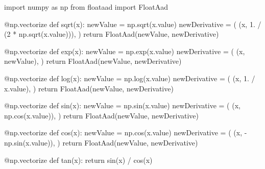 \documentclass[
  a4paper,
  DIV=11]{scrreprt}
\newenvironment{Shaded}{\begin{snugshade}}{\end{snugshade}}
\newcommand{\AttributeTok}[1]{\textcolor[rgb]{0.40,0.45,0.13}{#1}}
\newcommand{\ControlFlowTok}[1]{\textcolor[rgb]{0.00,0.23,0.31}{#1}}
\newcommand{\DecValTok}[1]{\textcolor[rgb]{0.68,0.00,0.00}{#1}}
\newcommand{\FloatTok}[1]{\textcolor[rgb]{0.68,0.00,0.00}{#1}}
\newcommand{\ImportTok}[1]{\textcolor[rgb]{0.00,0.46,0.62}{#1}}
\newcommand{\KeywordTok}[1]{\textcolor[rgb]{0.00,0.23,0.31}{#1}}
\newcommand{\NormalTok}[1]{\textcolor[rgb]{0.00,0.23,0.31}{#1}}
\newcommand{\OperatorTok}[1]{\textcolor[rgb]{0.37,0.37,0.37}{#1}}
\theoremstyle{definition}
\theoremstyle{definition}
\theoremstyle{remark}
\begin{document}
\begin{Shaded}
\begin{Highlighting}[]
\ImportTok{import}\NormalTok{ numpy }\ImportTok{as}\NormalTok{ np}
\ImportTok{from}\NormalTok{ floataad }\ImportTok{import}\NormalTok{ FloatAad}

\AttributeTok{@np.vectorize}
\KeywordTok{def}\NormalTok{ sqrt(x):}
\NormalTok{    newValue }\OperatorTok{=}\NormalTok{ np.sqrt(x.value)}
\NormalTok{    newDerivative }\OperatorTok{=}\NormalTok{ (}
\NormalTok{        (x, }\FloatTok{1.} \OperatorTok{/}\NormalTok{ (}\DecValTok{2} \OperatorTok{*}\NormalTok{ np.sqrt(x.value))),}
\NormalTok{    )}
    \ControlFlowTok{return}\NormalTok{ FloatAad(newValue, newDerivative)}

\AttributeTok{@np.vectorize}
\KeywordTok{def}\NormalTok{ exp(x):}
\NormalTok{    newValue }\OperatorTok{=}\NormalTok{ np.exp(x.value)}
\NormalTok{    newDerivative }\OperatorTok{=}\NormalTok{ (}
\NormalTok{        (x, newValue),}
\NormalTok{    )}
    \ControlFlowTok{return}\NormalTok{ FloatAad(newValue, newDerivative)}

\AttributeTok{@np.vectorize}
\KeywordTok{def}\NormalTok{ log(x):}
\NormalTok{    newValue }\OperatorTok{=}\NormalTok{ np.log(x.value)}
\NormalTok{    newDerivative }\OperatorTok{=}\NormalTok{ (}
\NormalTok{        (x, }\FloatTok{1.} \OperatorTok{/}\NormalTok{ x.value),}
\NormalTok{    )}
    \ControlFlowTok{return}\NormalTok{ FloatAad(newValue, newDerivative)}

\AttributeTok{@np.vectorize}
\KeywordTok{def}\NormalTok{ sin(x):}
\NormalTok{    newValue }\OperatorTok{=}\NormalTok{ np.sin(x.value)}
\NormalTok{    newDerivative }\OperatorTok{=}\NormalTok{ (}
\NormalTok{        (x, np.cos(x.value)),}
\NormalTok{    )}
    \ControlFlowTok{return}\NormalTok{ FloatAad(newValue, newDerivative)}

\AttributeTok{@np.vectorize}
\KeywordTok{def}\NormalTok{ cos(x):}
\NormalTok{    newValue }\OperatorTok{=}\NormalTok{ np.cos(x.value)}
\NormalTok{    newDerivative }\OperatorTok{=}\NormalTok{ (}
\NormalTok{        (x, }\OperatorTok{{-}}\NormalTok{np.sin(x.value)),}
\NormalTok{    )}
    \ControlFlowTok{return}\NormalTok{ FloatAad(newValue, newDerivative)}

\AttributeTok{@np.vectorize}
\KeywordTok{def}\NormalTok{ tan(x):}
    \ControlFlowTok{return}\NormalTok{ sin(x) }\OperatorTok{/}\NormalTok{ cos(x)}
\end{Highlighting}
\end{Shaded}
\end{document}
